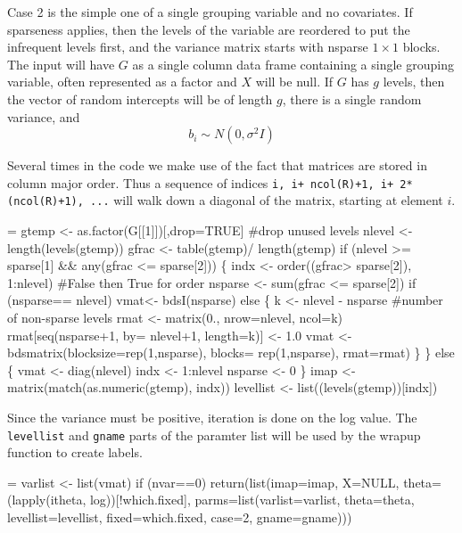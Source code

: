 \documentclass{article}
\begin{document}
Case 2 is the simple one of a single grouping variable and
no covariates. If sparseness
applies, then the levels of the variable are reordered to put the
infrequent levels first, and the variance matrix starts with
nsparse $1\times 1$ blocks.
The input will have $G$ as a single column data frame containing a single
grouping variable, often represented as a factor and  $X$ will be null.
If $G$ has $g$ levels, then the vector of random intercepts will be of
length $g$, there is a single random variance, and
$$
b_i \sim N(0, \sigma^2 I)
$$

Several times in the code we make use of the fact that matrices are
stored in column major order.  Thus a sequence of indices
\Verb!i, i+ ncol(R)+1, i+ 2*(ncol(R)+1), ...! will walk down a diagonal
of the matrix, starting at element $i$.
\begin{nwchunk}
=
 gtemp <- as.factor(G[[1]])[,drop=TRUE] #drop unused levels
 nlevel <- length(levels(gtemp))
 gfrac <- table(gtemp)/ length(gtemp)
 if (nlevel >= sparse[1] && any(gfrac <= sparse[2])) \{
     indx <- order((gfrac> sparse[2]), 1:nlevel)  #False then True for order
     nsparse <- sum(gfrac <= sparse[2])
     if (nsparse== nlevel) vmat<- bdsI(nsparse)
     else \{
         k <- nlevel - nsparse  #number of non-sparse levels
         rmat <- matrix(0., nrow=nlevel, ncol=k)
         rmat[seq(nsparse+1, by= nlevel+1, length=k)] <- 1.0
         vmat <- bdsmatrix(blocksize=rep(1,nsparse), 
                           blocks= rep(1,nsparse), rmat=rmat)
         \}
     \}
 else \{
     vmat <- diag(nlevel)
     indx <- 1:nlevel
     nsparse <- 0
     \}
 imap <- matrix(match(as.numeric(gtemp), indx))
 levellist <- list((levels(gtemp))[indx]) 
\end{nwchunk}

Since the variance must be positive, iteration is done on the
log value.  
The \Verb!levellist! and \Verb?gname? parts of the paramter list will be used
by the wrapup function to create labels.

\begin{nwchunk}
=
 varlist <- list(vmat)
 if (nvar==0) 
     return(list(imap=imap, X=NULL, 
                 theta=(lapply(itheta, log))[!which.fixed], 
                 parms=list(varlist=varlist, theta=theta, levellist=levellist,
                            fixed=which.fixed, case=2, gname=gname)))
\end{nwchunk}
\end{document}
